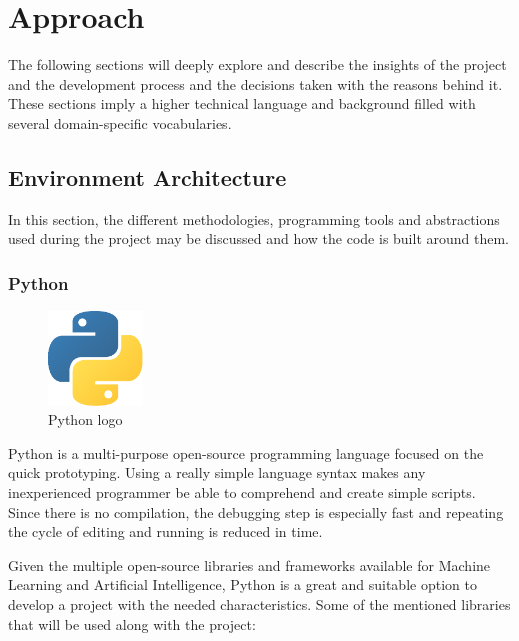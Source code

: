 
\chapter{Approach}

\label{approach}
The following sections will deeply explore and describe the insights of the project and the development process and the decisions taken with the reasons behind it. 
These sections imply a higher technical language and background filled with several domain-specific vocabularies.


\section{Environment Architecture}
In this section, the different methodologies, programming tools and abstractions used during the project may be discussed and how the code is built around them.

\subsection{Python}

\begin{figure}[th]
    \centering
    \begin{center}
        \includegraphics[height=25mm]{Figures/python}
    \end{center}
    \decoRule
    \caption{Python logo}
    \label{fig:python logo}
\end{figure}


Python is a multi-purpose open-source programming language focused on the quick prototyping. Using a really simple language syntax makes any inexperienced programmer be able to comprehend and create simple scripts. 
Since there is no compilation, the debugging step is especially fast and repeating the cycle of editing and running is reduced in time\cite{pythonabout}.

Given the multiple open-source libraries and frameworks available for Machine Learning and Artificial Intelligence, Python is a great and suitable option to develop a project with the needed characteristics.
Some of the mentioned libraries that will be used along with the project:

